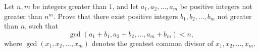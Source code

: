 Let $n, m$ be integers greater than $1$, and let $a_1, a_2, \dots, a_m$ be positive integers not greater than $n^m$. Prove that there exist positive integers $b_1, b_2, \dots, b_m$ not greater than $n$, such that \[ \gcd(a_1 + b_1, a_2 + b_2, \dots, a_m + b_m) < n, \] where $\gcd(x_1, x_2, \dots, x_m)$ denotes the greatest common divisor of $x_1, x_2, \dots, x_m$.